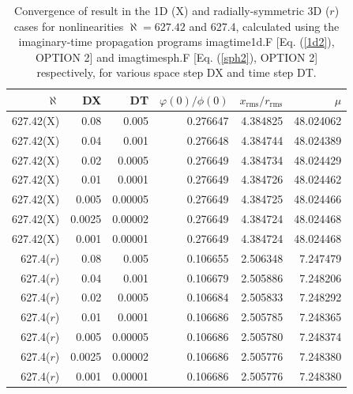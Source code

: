 \documentclass[onecolumn]{elsart3p}
\begin{document}
\begin{table}[!ht]
\begin{center}
\caption{Convergence of result in the   1D (X) and
radially-symmetric  3D ($r$) cases for  nonlinearities $\aleph 
=627.42$ and
627.4, calculated
using the imaginary-time propagation programs imagtime1d.F  [Eq.
(\ref{1d2}), OPTION 2]
and imagtimesph.F [Eq. (\ref{sph2}), OPTION 2]
respectively, for various space step DX and time step DT.
}
\label{table1}
\begin{tabular}{|r|r|r|r|r|r|}
\hline
$\aleph $  %
& DX  &  DT &
$\varphi(0)/\phi(0)$ &  $x_{\mathrm{rms}}/r_{\mathrm{rms}}$ &
{$\mu$ } \\
\hline
  627.42(X) & 0.08  & 0.005   & 0.276647 &   4.384825 & 48.024062  \\
  627.42(X) & 0.04  & 0.001  &0.276648 &4.384744 & 48.024389  \\
  627.42(X) & 0.02  &0.0005   &0.276649&     4.384734  & 48.024429  \\
  627.42(X) & 0.01 &  0.0001  &0.276649&    4.384726 &  48.024462  \\
  627.42(X) & 0.005  & 0.00005  &0.276649   &     4.384725 &
48.024466  \\
  627.42(X) & 0.0025  & 0.00002  &0.276649   &     4.384724 &
48.024468  \\
  627.42(X) & 0.001  &   0.00001  & 0.276649   &     4.384724 &
48.024468
\\
\hline
  627.4($r$) &0.08   &   0.005   &   0.106655 &      2.506348   &
7.247479
\\
  627.4($r$) &0.04   &    0.001  & 0.106679    &   2.505886    &
7.248206
\\
  627.4($r$) & 0.02  & 0.0005  & 0.106684&       2.505833  &  7.248292
\\
  627.4($r$) & 0.01& 0.0001  &0.106686&        2.505785     & 7.248365
\\
  627.4($r$) & 0.005  &  0.00005  &0.106686 &       2.505780  & 7.248374
\\
  627.4($r$) & 0.0025  &0.00002  &0.106686 &       2.505776    &
7.248380  \\
  627.4($r$) & 0.001  & 0.00001  & 0.106686   &    2.505776    &
7.248380  \\
\hline
\end{tabular}
\end{center}
\end{table}
\end{document}
